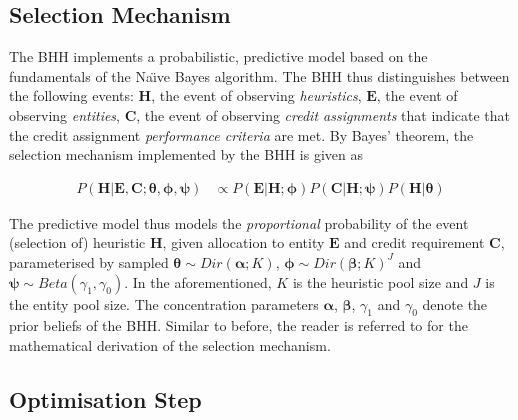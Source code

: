 \subsection{Selection Mechanism}\label{sec:bhh:selection_mechanism}

The \acs{BHH} implements a probabilistic, predictive model based on the fundamentals of the Na\"{\i}ve Bayes algorithm. The \acs{BHH} thus distinguishes between the following events: \textbf{$\boldsymbol{H}$}, the event of observing \textit{heuristics}, \textbf{$\boldsymbol{E}$}, the event of observing \textit{entities}, \textbf{$\boldsymbol{C}$}, the event of observing \textit{credit assignments} that indicate that the credit assignment \textit{performance criteria} are met. By Bayes' theorem, the selection mechanism implemented by the \acs{BHH} is given as

\begin{equation}
	\label{eq:bhh:selection_mechanism:predictive_model_prop_to}
	\begin{split}
		P(\boldsymbol{H} \vert \boldsymbol{E}, \boldsymbol{C}; \boldsymbol{\theta}, \boldsymbol{\phi}, \boldsymbol{\psi}) &\propto P(\boldsymbol{E} \vert \boldsymbol{H}; \boldsymbol{\phi}) P(\boldsymbol{C} \vert \boldsymbol{H}; \boldsymbol{\psi}) P(\boldsymbol{H} \vert \boldsymbol{\theta})
	\end{split}
\end{equation}

The predictive model thus models the \textit{proportional} probability of the event (selection of) heuristic $\boldsymbol{H}$, given allocation to entity $\boldsymbol{E}$ and credit requirement $\boldsymbol{C}$, parameterised by sampled $\boldsymbol{\theta} \sim Dir(\boldsymbol{\alpha}; K)$, $\boldsymbol{\phi} \sim Dir(\boldsymbol{\beta}; K)^{J}$ and $\boldsymbol{\psi} \sim Beta(\gamma_{1}, \gamma_{0})$. In the aforementioned, $K$ is the heuristic pool size and $J$ is the entity pool size. The concentration parameters $\boldsymbol{\alpha}$, $\boldsymbol{\beta}$, $\gamma_{1}$ and $\gamma_{0}$ denote the prior beliefs of the \acs{BHH}. Similar to before, the reader is referred to \cite{ref:schreuder:2022} for the mathematical derivation of the selection mechanism.

\subsection{Optimisation Step}\label{sec:bhh:optimisation_step}

